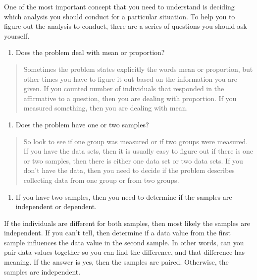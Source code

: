 \documentclass[]{book}
\providecommand{\tightlist}{%
  \setlength{\itemsep}{0pt}\setlength{\parskip}{0pt}}
\begin{document}
One of the most important concept that you need to understand is deciding which analysis you should conduct for a particular situation. To help you to figure out the analysis to conduct, there are a series of questions you should ask yourself.

\begin{enumerate}
\def\labelenumi{\arabic{enumi}.}
\tightlist
\item
  Does the problem deal with mean or proportion?
\end{enumerate}

\begin{quote}
Sometimes the problem states explicitly the words mean or proportion, but other times you have to figure it out based on the information you are given. If you counted number of individuals that responded in the affirmative to a question, then you are dealing with proportion. If you measured something, then you are dealing with mean.
\end{quote}

\begin{enumerate}
\def\labelenumi{\arabic{enumi}.}
\setcounter{enumi}{1}
\tightlist
\item
  Does the problem have one or two samples?
\end{enumerate}

\begin{quote}
So look to see if one group was measured or if two groups were measured. If you have the data sets, then it is usually easy to figure out if there is one or two samples, then there is either one data set or two data sets. If you don't have the data, then you need to decide if the problem describes collecting data from one group or from two groups.
\end{quote}

\begin{enumerate}
\def\labelenumi{\arabic{enumi}.}
\setcounter{enumi}{2}
\tightlist
\item
  If you have two samples, then you need to determine if the samples are independent or dependent.
\end{enumerate}

If the individuals are different for both samples, then most likely the samples are independent. If you can't tell, then determine if a data value from the first sample influences the data value in the second sample. In other words, can you pair data values together so you can find the difference, and that difference has meaning. If the answer is yes, then the samples are paired. Otherwise, the samples are independent.
\end{document}
